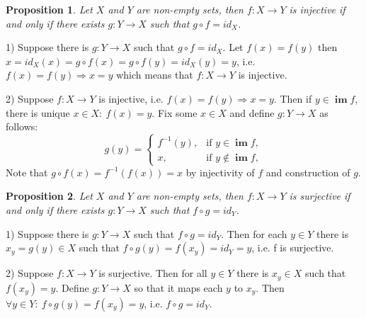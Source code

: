\documentclass[journal,10pt,onecolumn,draftclsnofoot,]{IEEEtran}
\makeatletter
\theoremstyle{plain}
\newtheorem{proposition}{Proposition}
\theoremstyle{definition}
\theoremstyle{remark}
\DeclareMathOperator{\image}{\mathbf{im}}
\renewenvironment{proof}[1][\proofname]{\par
  \pushQED{\qed}%
  \normalfont \topsep6\p@\@plus6\p@\relax
  \list{}{%
    \settowidth{\leftmargin}{\itshape\proofname:\hskip\labelsep}%
    \setlength{\labelwidth}{0pt}%
    \setlength{\itemindent}{-\leftmargin}%
  }%
  \item[\hskip\labelsep\itshape#1\@addpunct{:}]\ignorespaces
}{%
  \popQED\endlist\@endpefalse
}
\makeatother
\begin{document}
\begin{proposition}
Let $X$ and $Y$ are non-empty sets, then $f\colon X \rightarrow Y$ is injective if and only if there exists $g\colon Y \rightarrow X$ such that $g \circ f = id_X$.
\end{proposition}
\begin{proof}
1) Suppose there is $g\colon Y \rightarrow X$ such that $g \circ f = id_X$. Let $f(x) = f(y)$ then $x = id_X(x) = g \circ f(x) = g \circ f(y) = id_X(y) = y$,
i.e. $f(x) = f(y) \Rightarrow x = y$ which means that $f: X \rightarrow Y$ is injective.

2) Suppose $f\colon X \rightarrow Y$ is injective, i.e. $f(x) = f(y) \Rightarrow x = y$. Then if $y \in \image{f}$, there is unique $x \in X: ~f(x) = y$. Fix some $x \in X$ and define $g\colon Y \rightarrow X$ as follows:
$$g(y) = 
\begin{cases} 
f^{-1}(y), & \mbox{if } y \in \image{f}, \\
x, & \mbox{if } y \notin \image{f}, 
\end{cases}$$
Note that $g \circ f (x) = f^{-1}(f(x)) = x$ by injectivity of $f$ and construction of $g$.
\end{proof}

\begin{proposition}
Let $X$ and $Y$ are non-empty sets, then $f\colon X \rightarrow Y$ is surjective if and only if there exists $g\colon Y \rightarrow X$ such that $f \circ g = id_Y$.
\end{proposition}
\begin{proof}
1) Suppose there is $g\colon Y \rightarrow X$ such that $f \circ g = id_Y$. Then for each $y \in Y$ there is $x_y = g(y) \in X$ such that $f \circ g(y) = f(x_y) = id_Y = y$, i.e. f is surjective.

2) Suppose $f\colon X \rightarrow Y$ is surjective. Then for all $y \in Y$ there is $x_y \in X$ such that $f(x_y) = y$. Define $g \colon Y \rightarrow X$ so that it maps each $y$ to $x_y$. Then $\forall y \in Y:~ f \circ g(y) = f(x_y) = y $, 
i.e. $f \circ g = id_Y$.
\end{proof}
\end{document}
